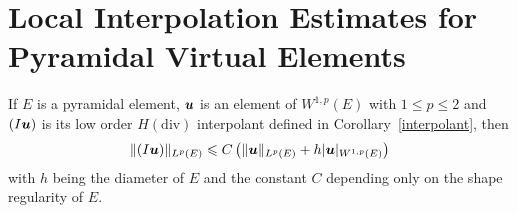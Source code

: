 \section{Local Interpolation Estimates for Pyramidal Virtual Elements}
\begin{lemma}\label{auxlabel6}
If $E$ is a pyramidal element, $\boldsymbol{u}$ is an element of $W^{1,p}(E)$ with 
$1\leqslant p\leqslant 2$
and $(I\boldsymbol{u})$ is its low order $H(\text{div})$ interpolant defined in Corollary~\ref{interpolant},
then
\begin{equation}\label{estab2}
\|(I\boldsymbol{u})\|_{L^p(E)}\leqslant C\left(\|\boldsymbol{u}\|_{L^p(E)}+ h|\boldsymbol{u}|_{W^{1,p}(E)}\right)
\end{equation}
with $h$ being the diameter of $E$ and the constant $C$ depending only on the shape regularity of $E$.
\end{lemma}
